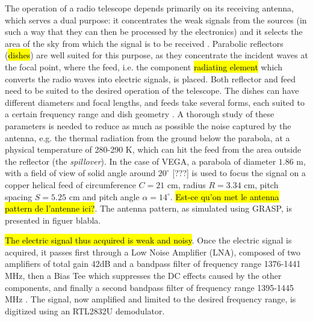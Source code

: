 The operation of a radio telescope depends primarily on its receiving antenna, which serves a dual purpose: it concentrates the weak signals from the sources (in such a way that they can then be processed by the electronics) and it selects the area of the sky from which the signal is to be received \cite{lauterbach_radio_2022}.
Parabolic reflectors (\hl{dishes}) are well suited for this purpose, as they concentrate the incident waves at the focal point, where the feed, i.e. the component \hl{radiating element} which converts the radio waves into electric signals, is placed.
Both reflector and feed need to be suited to the desired operation of the telescope.
The dishes can have different diameters and focal lengths, and
feeds take several forms, each suited to a certain frequency range and dish geometry \cite{lauterbach_radio_2022}. 
A thorough study of these parameters is needed to reduce as much as possible the noise captured by the antenna, e.g. the thermal radiation from the ground below the parabola, at a physical temperature of 280-290 K, which can hit the feed from the area outside the reflector (the \emph{spillover})\footnotemark \cite{burke_introduction_2013}.
In the case of VEGA, a parabola of diameter $1.86$ m, with a field of view of solid angle around $20^{\circ}$ [???] is used to focus the signal on a copper helical feed of circumference $C = 21$ cm, radius $R = 3.34$ cm, pitch spacing $S = 5.25$ cm and pitch angle $\alpha = 14^{\circ}$. \hl{Est-ce qu'on met le antenna pattern de l'antenne ici?}. The antenna pattern, as simulated using GRASP, is presented in figuer blabla.

\hl{The electric signal thus acquired is weak and noisy}.
Once the electric signal is acquired, it passes first through a Low Noise Amplifier (LNA), composed of two amplifiers of total gain 42dB and a bandpass filter of frequency range 1376-1441 MHz, then a Bias Tee which suppresses the DC effects caused by the other components, and finally a second bandpass filter of frequency range 1395-1445 MHz \cite{interdisciplinary_project_2022}.
The signal, now amplified and limited to the desired frequency range, is digitized using an RTL2832U demodulator. 


